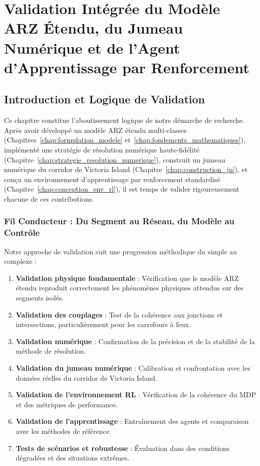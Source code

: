 \chapter{Validation Intégrée du Modèle ARZ Étendu, du Jumeau Numérique et de l'Agent d'Apprentissage par Renforcement}
\label{chap:validation_entrainement}

\section{Introduction et Logique de Validation}
\label{sec:intro_logique_validation}

Ce chapitre constitue l'aboutissement logique de notre démarche de recherche. Après avoir développé un modèle ARZ étendu multi-classes (Chapitres~\ref{chap:formulation_modele} et~\ref{chap:fondements_mathematiques}), implémenté une stratégie de résolution numérique haute-fidélité (Chapitre~\ref{chap:strategie_resolution_numerique}), construit un jumeau numérique du corridor de Victoria Island (Chapitre~\ref{chap:construction_jn}), et conçu un environnement d'apprentissage par renforcement standardisé (Chapitre~\ref{chap:conception_env_rl}), il est temps de valider rigoureusement chacune de ces contributions.

\subsection{Fil Conducteur : Du Segment au Réseau, du Modèle au Contrôle}
\label{subsec:fil_conducteur}

Notre approche de validation suit une progression méthodique du simple au complexe :
\begin{enumerate}
  \item \textbf{Validation physique fondamentale} : Vérification que le modèle ARZ étendu reproduit correctement les phénomènes physiques attendus sur des segments isolés.
  \item \textbf{Validation des couplages} : Test de la cohérence aux jonctions et intersections, particulièrement pour les carrefours à feux.
  \item \textbf{Validation numérique} : Confirmation de la précision et de la stabilité de la méthode de résolution.
  \item \textbf{Validation du jumeau numérique} : Calibration et confrontation avec les données réelles du corridor de Victoria Island.
  \item \textbf{Validation de l'environnement RL} : Vérification de la cohérence du MDP et des métriques de performance.
  \item \textbf{Validation de l'apprentissage} : Entraînement des agents et comparaison avec les méthodes de référence.
  \item \textbf{Tests de scénarios et robustesse} : Évaluation dans des conditions dégradées et des situations extrêmes.
\end{enumerate}

